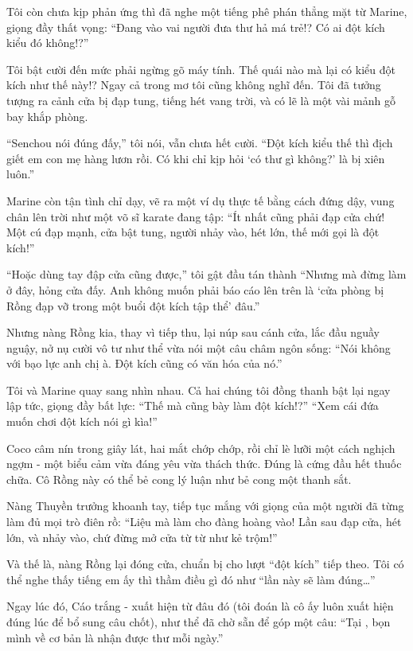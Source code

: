 \documentclass[../main.tex]{subfiles}
\begin{document}
Tôi còn chưa kịp phản ứng thì đã nghe một tiếng phê phán thẳng mặt từ Marine, giọng đầy thất vọng: ``Đang vào vai người đưa thư hả má trẻ!? Có ai đột kích kiểu đó không!?''

Tôi bật cười đến mức phải ngừng gõ máy tính. Thế quái nào mà lại có kiểu đột kích như thế này!? Ngay cả trong mơ tôi cũng không nghĩ đến. Tôi đã tưởng tượng ra cảnh cửa bị đạp tung, tiếng hét vang trời, và có lẽ là một vài mảnh gỗ bay khắp phòng.

``Senchou nói đúng đấy,'' tôi nói, vẫn chưa hết cười. ``Đột kích kiểu thế thì địch giết em con mẹ hàng lươn rồi. Có khi chỉ kịp hỏi `có thư gì không?' là bị xiên luôn.''

Marine còn tận tình chỉ dạy, vẽ ra một ví dụ thực tế bằng cách đứng dậy, vung chân lên trời như một võ sĩ karate đang tập: ``Ít nhất cũng phải đạp cửa chứ! Một cú đạp mạnh, cửa bật tung, người nhảy vào, hét lớn, thế mới gọi là đột kích!''


``Hoặc dùng tay đập cửa cũng được,'' tôi gật đầu tán thành ``Nhưng mà đừng làm ở đây, hỏng cửa đấy. Anh không muốn phải báo cáo lên trên là `cửa phòng bị Rồng đạp vỡ trong một buổi đột kích tập thể' đâu.''

Nhưng nàng Rồng kia, thay vì tiếp thu, lại núp sau cánh cửa, lắc đầu nguầy nguậy, nở nụ cười vô tư như thể vừa nói một câu châm ngôn sống: ``Nói không với bạo lực anh chị à. Đột kích cũng có văn hóa của nó.''

Tôi và Marine quay sang nhìn nhau. Cả hai chúng tôi đồng thanh bật lại ngay lập tức, giọng đầy bất lực: ``Thế mà cũng bày làm đột kích!?''
``Xem cái đứa muốn chơi đột kích nói gì kìa!''

Coco câm nín trong giây lát, hai mắt chớp chớp, rồi chỉ lè lưỡi một cách nghịch ngợm - một biểu cảm vừa đáng yêu vừa thách thức. Đúng là cứng đầu hết thuốc chữa. Cô Rồng này có thể bẻ cong lý luận như bẻ cong một thanh sắt.

Nàng Thuyền trưởng khoanh tay, tiếp tục mắng với giọng của một người đã từng làm đủ mọi trò điên rồ: ``Liệu mà làm cho đàng hoàng vào! Lần sau đạp cửa, hét lớn, và nhảy vào, chứ đừng mở cửa từ từ như kẻ trộm!''

Và thế là, nàng Rồng lại đóng cửa, chuẩn bị cho lượt ``đột kích'' tiếp theo. Tôi có thể nghe thấy tiếng em ấy thì thầm điều gì đó như ``lần này sẽ làm đúng\dots''

\il

Ngay lúc đó, Cáo trắng - xuất hiện từ đâu đó (tôi đoán là cô ấy luôn xuất hiện đúng lúc để bổ sung câu chốt), như thể đã chờ sẵn để góp một câu: ``Tại \hll, bọn mình về cơ bản là nhận được thư mỗi ngày.''
\end{document}
